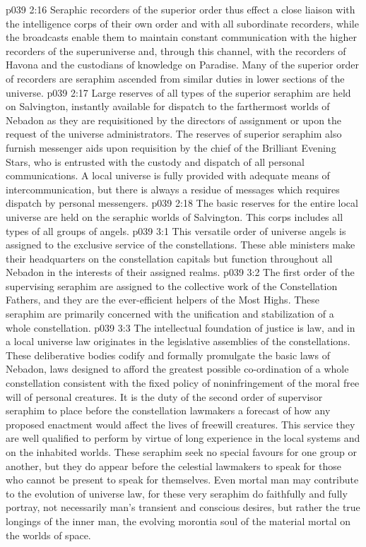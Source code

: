\vs p039 2:16 Seraphic recorders of the superior order thus effect a close liaison with the intelligence corps of their own order and with all subordinate recorders, while the broadcasts enable them to maintain constant communication with the higher recorders of the superuniverse and, through this channel, with the recorders of Havona and the custodians of knowledge on Paradise. Many of the superior order of recorders are seraphim ascended from similar duties in lower sections of the universe.
\vs p039 2:17 \bibnobreakspace {} Large reserves of all types of the superior seraphim are held on Salvington, instantly available for dispatch to the farthermost worlds of Nebadon as they are requisitioned by the directors of assignment or upon the request of the universe administrators. The reserves of superior seraphim also furnish messenger aids upon requisition by the chief of the Brilliant Evening Stars, who is entrusted with the custody and dispatch of all personal communications. A local universe is fully provided with adequate means of intercommunication, but there is always a residue of messages which requires dispatch by personal messengers.
\vs p039 2:18 \pc The basic reserves for the entire local universe are held on the seraphic worlds of Salvington. This corps includes all types of all groups of angels.
\vs p039 3:1 This versatile order of universe angels is assigned to the exclusive service of the constellations. These able ministers make their headquarters on the constellation capitals but function throughout all Nebadon in the interests of their assigned realms.
\vs p039 3:2 \bibnobreakspace {} The first order of the supervising seraphim are assigned to the collective work of the Constellation Fathers, and they are the ever\hyp{}efficient helpers of the Most Highs. These seraphim are primarily concerned with the unification and stabilization of a whole constellation.
\vs p039 3:3 \bibnobreakspace {} The intellectual foundation of justice is law, and in a local universe law originates in the legislative assemblies of the constellations. These deliberative bodies codify and formally promulgate the basic laws of Nebadon, laws designed to afford the greatest possible co\hyp{}ordination of a whole constellation consistent with the fixed policy of noninfringement of the moral free will of personal creatures. It is the duty of the second order of supervisor seraphim to place before the constellation lawmakers a forecast of how any proposed enactment would affect the lives of freewill creatures. This service they are well qualified to perform by virtue of long experience in the local systems and on the inhabited worlds. These seraphim seek no special favours for one group or another, but they do appear before the celestial lawmakers to speak for those who cannot be present to speak for themselves. Even mortal man may contribute to the evolution of universe law, for these very seraphim do faithfully and fully portray, not necessarily man’s transient and conscious desires, but rather the true longings of the inner man, the evolving morontia soul of the material mortal on the worlds of space.
